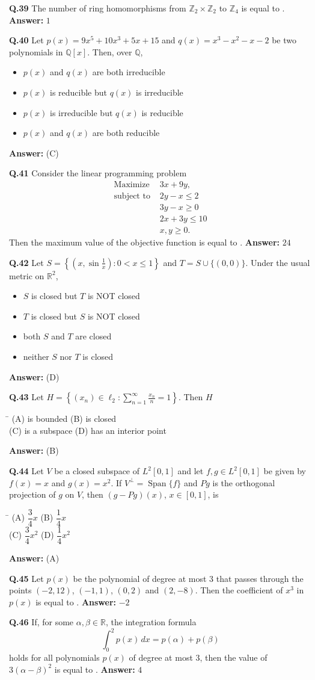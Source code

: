 \documentclass[11pt,a4paper]{article}
\newcommand{\optsfourA}[4]{%
  \begin{tabbing}
    \hspace{0.48\linewidth}\=\kill
    (A) #1 \> (B) #2 \\[2pt]
    (C) #3 \> (D) #4
  \end{tabbing}%
}
\newcommand{\optslistA}[4]{%
  \begin{itemize}
    \setlength{\itemsep}{2pt}\setlength{\parskip}{0pt}
    \item[(A)] #1
    \item[(B)] #2
    \item[(C)] #3
    \item[(D)] #4
  \end{itemize}%
}
\newcommand{\ans}[1]{\textbf{Answer:} #1\par\medskip}
\begin{document}
\textbf{Q.39} The number of ring homomorphisms from $\mathbb{Z}_2 \times \mathbb{Z}_2$ to $\mathbb{Z}_4$ is equal to \underline{\hspace{2cm}}.
\ans{$1$}

\textbf{Q.40} Let $p(x) = 9x^5 + 10x^3 + 5x + 15$ and $q(x) = x^3 - x^2 - x - 2$ be two polynomials in $\mathbb{Q}[x]$. Then, over $\mathbb{Q}$,
\optslistA{$p(x)$ and $q(x)$ are both irreducible}{$p(x)$ is reducible but $q(x)$ is irreducible}{$p(x)$ is irreducible but $q(x)$ is reducible}{$p(x)$ and $q(x)$ are both reducible}
\ans{(C)}

\textbf{Q.41} Consider the linear programming problem
\begin{align*}
  \text{Maximize } & 3x + 9y, \\
  \text{subject to } & 2y - x \le 2 \\
                     & 3y - x \ge 0 \\
                     & 2x + 3y \le 10 \\
                     & x, y \ge 0.
\end{align*}
Then the maximum value of the objective function is equal to \underline{\hspace{2cm}}.
\ans{$24$}

\textbf{Q.42} Let $S = \left\{\left(x, \sin\frac{1}{x}\right) : 0 < x \le 1\right\}$ and $T = S \cup \{(0, 0)\}$. Under the usual metric on $\mathbb{R}^2$,
\optslistA{$S$ is closed but $T$ is NOT closed}{$T$ is closed but $S$ is NOT closed}{both $S$ and $T$ are closed}{neither $S$ nor $T$ is closed}
\ans{(D)}

\textbf{Q.43} Let $H = \left\{(x_n) \in \ell_2 : \sum_{n=1}^{\infty} \frac{x_n}{n} = 1\right\}$. Then $H$
\optsfourA{is bounded}{is closed}{is a subspace}{has an interior point}
\ans{(B)}

\textbf{Q.44} Let $V$ be a closed subspace of $L^2[0, 1]$ and let $f, g \in L^2[0, 1]$ be given by $f(x) = x$ and $g(x) = x^2$. If $V^\perp = \operatorname{Span}\{f\}$ and $Pg$ is the orthogonal projection of $g$ on $V$, then $(g - Pg)(x)$, $x \in [0, 1]$, is
\optsfourA{$\dfrac{3}{4} x$}{$\dfrac{1}{4} x$}{$\dfrac{3}{4} x^2$}{$\dfrac{1}{4} x^2$}
\ans{(A)}

\textbf{Q.45} Let $p(x)$ be the polynomial of degree at most $3$ that passes through the points $(-2, 12)$, $(-1, 1)$, $(0, 2)$ and $(2, -8)$. Then the coefficient of $x^3$ in $p(x)$ is equal to \underline{\hspace{2cm}}.
\ans{$-2$}

\textbf{Q.46} If, for some $\alpha, \beta \in \mathbb{R}$, the integration formula
\[
  \int_0^2 p(x)\,dx = p(\alpha) + p(\beta)
\]
holds for all polynomials $p(x)$ of degree at most $3$, then the value of $3(\alpha - \beta)^2$ is equal to \underline{\hspace{2cm}}.
\ans{$4$}
\end{document}
